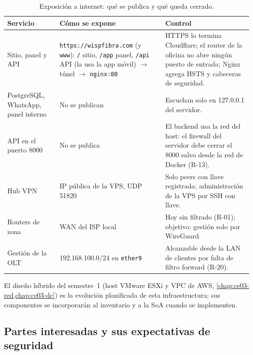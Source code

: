 \begin{table}[htbp]
\centering
\caption{Exposición a internet: qué se publica y qué queda cerrado.}
\label{tab:ce03-sgsi-publicacion}
\small
\begin{tabularx}{\textwidth}{L{3.6cm}L{3.4cm}X}
\toprule
\textbf{Servicio} & \textbf{Cómo se expone} & \textbf{Control} \\
\midrule
Sitio, panel y API & \texttt{https://wispfibra.com} (y \texttt{www}): \texttt{/} sitio, \texttt{/app} panel, \texttt{/api} API (la usa la app móvil) $\rightarrow$ túnel $\rightarrow$ \texttt{nginx:80} & HTTPS lo termina Cloudflare; el router de la oficina no abre ningún puerto de entrada; Nginx agrega HSTS y cabeceras de seguridad. \\
PostgreSQL, WhatsApp, panel interno & No se publican & Escuchan solo en 127.0.0.1 del servidor. \\
API en el puerto 8000 & No se publica & El backend usa la red del host: el firewall del servidor debe cerrar el 8000 salvo desde la red de Docker (R-13). \\
Hub VPN & IP pública de la VPS, UDP 51820 & Solo peers con llave registrada; administración de la VPS por SSH con llave. \\
Routers de zona & WAN del ISP local & Hoy sin filtrado (R-01); objetivo: gestión solo por WireGuard. \\
Gestión de la OLT & 192.168.100.0/24 en \texttt{ether9} & Alcanzable desde la LAN de clientes por falta de filtro forward (R-20). \\
\bottomrule
\end{tabularx}
\end{table}

\noindent El diseño híbrido del semestre~1 (host VMware ESXi y VPC de AWS,
\cref{chap:ce03-red,chap:ce03-dc}) es la evolución planificada de esta infraestructura; sus
componentes se incorporarán al inventario y a la SoA cuando se implementen.

\subsection{Partes interesadas y sus expectativas de seguridad}

